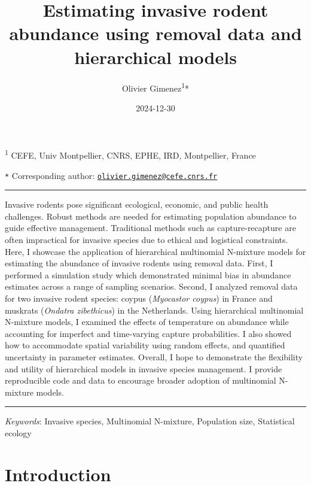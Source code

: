 \documentclass[
  11pt,
  a4paper,
]{article}
\title{Estimating invasive rodent abundance using removal data and hierarchical models}
\author{Olivier Gimenez\textsuperscript{1}*}
\date{2024-12-30}
\begin{document}
\maketitle

\linenumbers

\small

\textsuperscript{1} CEFE, Univ Montpellier, CNRS, EPHE, IRD, Montpellier, France

\texttt{*} Corresponding author: \href{mailto:olivier.gimenez@cefe.cnrs.fr}{\nolinkurl{olivier.gimenez@cefe.cnrs.fr}}

\normalsize

\vspace{1cm}
\hrule

Invasive rodents pose significant ecological, economic, and public health challenges. Robust methods are needed for estimating population abundance to guide effective management. Traditional methods such as capture-recapture are often impractical for invasive species due to ethical and logistical constraints. Here, I showcase the application of hierarchical multinomial N-mixture models for estimating the abundance of invasive rodents using removal data. First, I performed a simulation study which demonstrated minimal bias in abundance estimates across a range of sampling scenarios. Second, I analyzed removal data for two invasive rodent species: coypus (\emph{Myocastor coypus}) in France and muskrats (\emph{Ondatra zibethicus}) in the Netherlands. Using hierarchical multinomial N-mixture models, I examined the effects of temperature on abundance while accounting for imperfect and time-varying capture probabilities. I also showed how to accommodate spatial variability using random effects, and quantified uncertainty in parameter estimates. Overall, I hope to demonstrate the flexibility and utility of hierarchical models in invasive species management. I provide reproducible code and data to encourage broader adoption of multinomial N-mixture models.

\vspace{3mm}
\hrule
\vspace{5mm}

\emph{Keywords}: Invasive species, Multinomial N-mixture, Population size, Statistical ecology

\newpage

\section{Introduction}\label{introduction}
\end{document}

